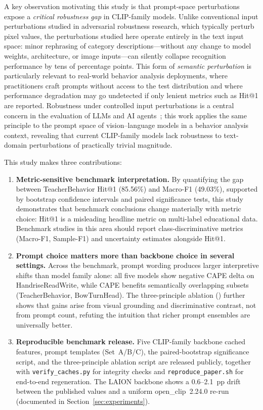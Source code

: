 \documentclass[symmetry,article,submit,pdftex,moreauthors]{Definitions/mdpi}
\begin{document}
A key observation motivating this study is that prompt-space perturbations expose a \emph{critical robustness gap} in CLIP-family models. Unlike conventional input perturbations studied in adversarial robustness research, which typically perturb pixel values, the perturbations studied here operate entirely in the text input space: minor rephrasing of category descriptions---without any change to model weights, architecture, or image inputs---can silently collapse recognition performance by tens of percentage points. This form of \emph{semantic perturbation} is particularly relevant to real-world behavior analysis deployments, where practitioners craft prompts without access to the test distribution and where performance degradation may go undetected if only lenient metrics such as Hit@1 are reported. Robustness under controlled input perturbations is a central concern in the evaluation of LLMs and AI agents~\cite{zhou2025security_llm,deng2025ai_agents}; this work applies the same principle to the prompt space of vision--language models in a behavior analysis context, revealing that current CLIP-family models lack robustness to text-domain perturbations of practically trivial magnitude.

This study makes three contributions:

\begin{enumerate}
    \item \textbf{Metric-sensitive benchmark interpretation.} By quantifying the gap between TeacherBehavior Hit@1 (85.56\%) and Macro-F1 (49.03\%), supported by bootstrap confidence intervals and paired significance tests, this study demonstrates that benchmark conclusions change materially with metric choice: Hit@1 is a misleading headline metric on multi-label educational data. Benchmark studies in this area should report class-discriminative metrics (Macro-F1, Sample-F1) and uncertainty estimates alongside Hit@1.

    \item \textbf{Prompt choice matters more than backbone choice in several settings.} Across the benchmark, prompt wording produces larger interpretive shifts than model family alone: all five models show negative CAPE delta on HandriseReadWrite, while CAPE benefits semantically overlapping subsets (TeacherBehavior, BowTurnHead). The three-principle ablation () further shows that gains arise from visual grounding and discriminative contrast, not from prompt count, refuting the intuition that richer prompt ensembles are universally better.

    \item \textbf{Reproducible benchmark release.} Five CLIP-family backbone cached features, prompt templates (Set~A/B/C), the paired-bootstrap significance script, and the three-principle ablation script are released publicly, together with \texttt{verify\_caches.py} for integrity checks and \texttt{reproduce\_paper.sh} for end-to-end regeneration. The LAION backbone shows a 0.6--2.1~pp drift between the published values and a uniform open\_clip~2.24.0 re-run (documented in Section~\ref{sec:experiments}).
\end{enumerate}
\end{document}
